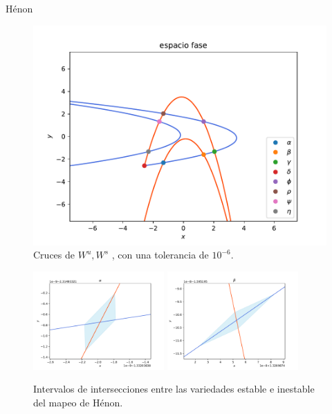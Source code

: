 \documentclass[11pt]{beamer}
\theoremstyle{definition}
\begin{document}
\begin{frame}{H\'enon}
\begin{figure}
\centering
\includegraphics[scale=0.5]{crucesL}
\caption{Cruces de $W^{u},W^{s}$ , con una tolerancia de $10^{-6}$.}
\label{crucesH}
\end{figure}
\end{frame}

\begin{frame}
\begin{figure}
\includegraphics[width=50mm]{alpha}
\includegraphics[width=50mm]{beta}
\caption{Intervalos de intersecciones entre las variedades estable e inestable del mapeo de Hénon.} 
\label{matriz_cortes}
\end{figure}
\end{frame}
\end{document}
